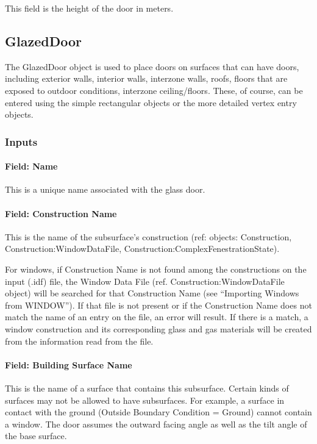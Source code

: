 This field is the height of the door in meters.

\subsection{GlazedDoor}\label{glazeddoor}

The GlazedDoor object is used to place doors on surfaces that can have doors, including exterior walls, interior walls, interzone walls, roofs, floors that are exposed to outdoor conditions, interzone ceiling/floors. These, of course, can be entered using the simple rectangular objects or the more detailed vertex entry objects.

\subsubsection{Inputs}\label{inputs-16-012}

\paragraph{Field: Name}\label{field-name-12-012}

This is a unique name associated with the glass door.

\paragraph{Field: Construction Name}\label{field-construction-name-12}

This is the name of the subsurface's construction (ref: objects: Construction, Construction:WindowDataFile, Construction:ComplexFenestrationState).

For windows, if Construction Name is not found among the constructions on the input (.idf) file, the Window Data File (ref. Construction:WindowDataFile object) will be searched for that Construction Name (see ``Importing Windows from WINDOW''). If that file is not present or if the Construction Name does not match the name of an entry on the file, an error will result. If there is a match, a window construction and its corresponding glass and gas materials will be created from the information read from the file.

\paragraph{Field: Building Surface Name}\label{field-building-surface-name-2}

This is the name of a surface that contains this subsurface. Certain kinds of surfaces may not be allowed to have subsurfaces. For example, a surface in contact with the ground (Outside Boundary Condition = Ground) cannot contain a window. The door assumes the outward facing angle as well as the tilt angle of the base surface.

